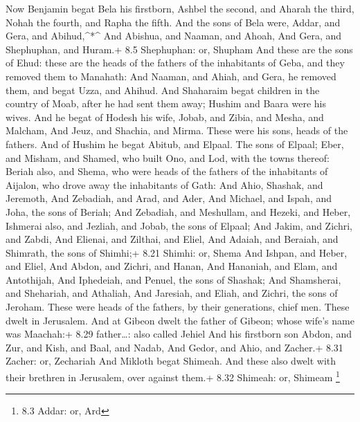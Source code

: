  Now Benjamin begat Bela his firstborn, Ashbel the second,
and Aharah the third,  Nohah the fourth, and Rapha the
fifth.  And the sons of Bela were, Addar, and Gera, and
Abihud,\^{}*\^{}  And Abishua, and Naaman, and Ahoah,
 And Gera, and Shephuphan, and Huram.+ 8.5 Shephuphan: or,
Shupham  And these are the sons of Ehud: these are the heads
of the fathers of the inhabitants of Geba, and they removed them to
Manahath:  And Naaman, and Ahiah, and Gera, he removed them,
and begat Uzza, and Ahihud.  And Shaharaim begat children in
the country of Moab, after he had sent them away; Hushim and Baara were
his wives.  And he begat of Hodesh his wife, Jobab, and
Zibia, and Mesha, and Malcham,  And Jeuz, and Shachia, and
Mirma. These were his sons, heads of the fathers.  And of
Hushim he begat Abitub, and Elpaal.  The sons of Elpaal;
Eber, and Misham, and Shamed, who built Ono, and Lod, with the towns
thereof:  Beriah also, and Shema, who were heads of the
fathers of the inhabitants of Aijalon, who drove away the inhabitants of
Gath:  And Ahio, Shashak, and Jeremoth,  And
Zebadiah, and Arad, and Ader,  And Michael, and Ispah, and
Joha, the sons of Beriah;  And Zebadiah, and Meshullam, and
Hezeki, and Heber,  Ishmerai also, and Jezliah, and Jobab,
the sons of Elpaal;  And Jakim, and Zichri, and Zabdi,
 And Elienai, and Zilthai, and Eliel,  And
Adaiah, and Beraiah, and Shimrath, the sons of Shimhi;+ 8.21 Shimhi: or,
Shema  And Ishpan, and Heber, and Eliel,  And
Abdon, and Zichri, and Hanan,  And Hananiah, and Elam, and
Antothijah,  And Iphedeiah, and Penuel, the sons of
Shashak;  And Shamsherai, and Shehariah, and Athaliah,
 And Jaresiah, and Eliah, and Zichri, the sons of Jeroham.
 These were heads of the fathers, by their generations,
chief men. These dwelt in Jerusalem.  And at Gibeon dwelt
the father of Gibeon; whose wife's name was Maachah:+ 8.29 father\ldots:
also called Jehiel  And his firstborn son Abdon, and Zur,
and Kish, and Baal, and Nadab,  And Gedor, and Ahio, and
Zacher.+ 8.31 Zacher: or, Zechariah  And Mikloth begat
Shimeah. And these also dwelt with their brethren in Jerusalem, over
against them.+ 8.32 Shimeah: or, Shimeam \footnote{8.3 Addar: or, Ard}

